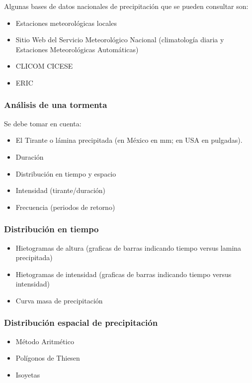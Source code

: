Algunas bases de datos nacionales de precipitación que se pueden consultar son:
\begin{itemize}
    \item Estaciones meteorológicas locales
    \item Sitio Web del Servicio Meteorológico Nacional (climatología diaria y Estaciones Meteorológicas Automáticas)
    \item CLICOM CICESE
    \item ERIC 
\end{itemize}
\subsubsection{Análisis de una tormenta}
Se debe tomar en cuenta:
\begin{itemize}
    \item El Tirante o lámina precipitada (en México en mm; en USA en pulgadas).
	\item Duración
	\item Distribución en tiempo y espacio
	\item Intensidad (tirante/duración)
	\item Frecuencia (periodos de retorno)
\end{itemize}
\subsubsection{Distribución en tiempo}
\begin{itemize}
	\item Hietogramas de altura (graficas de barras indicando tiempo versus lamina precipitada)
	\item Hietogramas de intensidad (graficas de barras indicando tiempo versus intensidad)
	\item Curva masa de precipitación
\end{itemize}
\subsubsection{Distribución espacial de precipitación}
\begin{itemize}
    \item Método Aritmético
    \item Polígonos de Thiesen
    \item Isoyetas
\end{itemize}
